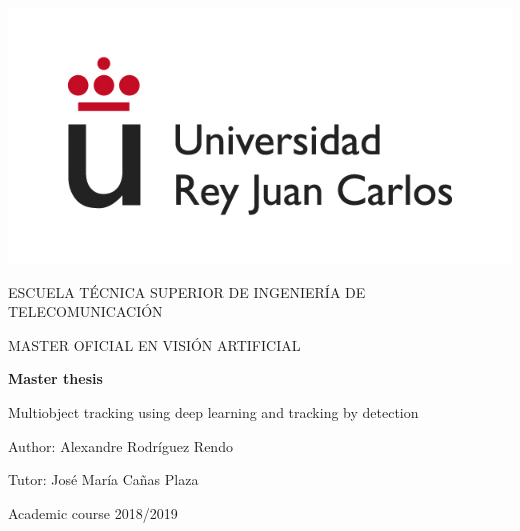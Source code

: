 \begin{titlepage}
	
	\begin{center}
		\vspace*{7.7mm}
		\begin{center}
			\includegraphics[width=0.4\linewidth]{figures/logo.jpg}
		\end{center}
		\vspace{6.5mm}
		
		\fontsize{15.5}{14}\selectfont ESCUELA TÉCNICA SUPERIOR DE INGENIERÍA DE TELECOMUNICACIÓN
		\vspace{13mm}
		
		\fontsize{14}{14}\selectfont MASTER OFICIAL EN VISIÓN ARTIFICIAL 
		
		\vspace{70pt}
		
		\fontsize{15.7}{14}\selectfont \textbf{Master thesis} 
		
		\vspace{25mm}
		\begin{huge}
			Multiobject tracking using deep learning and tracking by detection
		\end{huge}
		
		\vspace{25mm}
		
		\begin{large}
			Author: Alexandre Rodríguez Rendo
			
			Tutor: José María Cañas Plaza
						
			\vspace{10mm}
		\end{large}
		\begin{normalsize}
			Academic course 2018/2019		
		\end{normalsize}
		\vspace{10mm}
		
	\end{center}
	
\end{titlepage}

\pagebreak
\thispagestyle{empty}
\vspace*{12cm}

